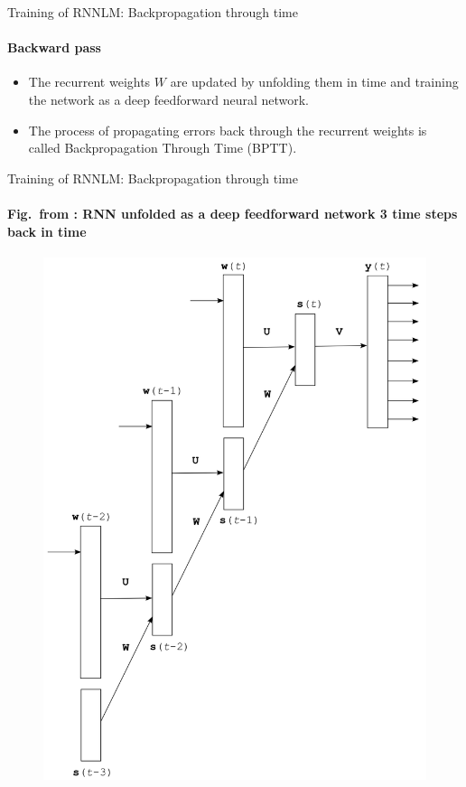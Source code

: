\begin{frame}{Training of RNNLM: Backpropagation through time}
\framesubtitle{Backward pass}
\begin{itemize}[<+->]
	\item The recurrent weights $W$ are updated by unfolding them in time and training the network as a deep feedforward neural network.
	\item The process of propagating errors back through the recurrent weights is called Backpropagation Through Time (BPTT).
\end{itemize}
\end{frame}

\begin{frame}{Training of RNNLM: Backpropagation through time}
\framesubtitle{Fig.\ from \cite{Mikolov2010}: RNN unfolded as a deep feedforward network 3 time steps back in time}
\centering
\begin{figure}
\includegraphics[scale=0.25]{figures/nlm/rnn-bptt.png}
\end{figure}
\end{frame}

